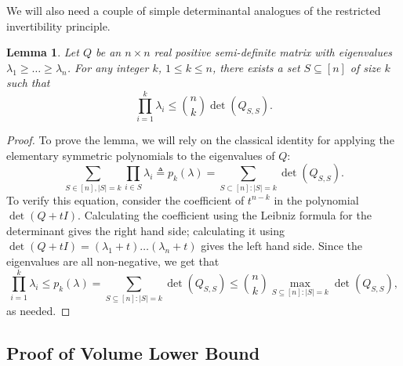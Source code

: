 \documentclass[11pt]{article}
\newtheorem{lemma}[theorem]{Lemma}
\newcommand{\eqdef}{\triangleq}
\begin{document}
We will also need a couple of simple determinantal analogues of the restricted
invertibility principle.

\begin{lemma}\label{lm:rip-det}
  Let $Q$ be an $n\times n$ real positive semi-definite matrix with
  eigenvalues $\lambda_1 \ge \ldots \ge \lambda_n$. For any integer
  $k$, $1 \le k \le n$, there exists a set $S \subseteq [n]$ of size $k$
  such that
  \[\prod_{i=1}^k \lambda_i \leq \binom{n}{k} \det(Q_{S,S}).\]
\end{lemma}
\begin{proof}
To prove the lemma, we will rely on the classical identity for applying the
elementary symmetric polynomials to the eigenvalues of $Q$:
\begin{equation*}
\sum_{S \in [n],|S|=k} \prod_{i \in S} \lambda_i \eqdef p_k(\lambda) = \sum_{S \subset [n]: |S| = k}\det(Q_{S,S}).
\end{equation*}
To verify this equation, consider the coefficient of $t^{n-k}$ in the polynomial
$\det(Q + tI)$. Calculating the coefficient using the Leibniz formula for the
determinant gives the right hand side; calculating it using $\det(Q + tI) =
(\lambda_1 + t)\ldots(\lambda_n + t)$ gives the left hand side. Since the 
eigenvalues are all non-negative, we get that
\[
\prod_{i=1}^k \lambda_i \leq p_k(\lambda) =  
 \sum_{S \subseteq [n]: |S|=k} \det(Q_{S,S}) \leq \binom{n}{k} \max_{S
\subseteq [n]: |S|=k} \det(Q_{S,S}),
\]
as needed.
\end{proof}

\subsection{Proof of Volume Lower Bound}
\label{sec:proof-vollb}
\end{document}
